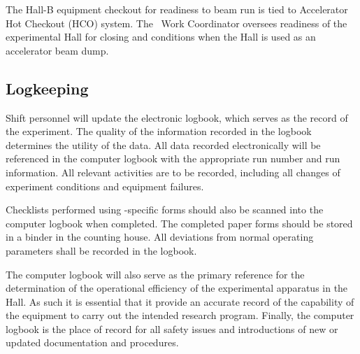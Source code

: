 \documentclass[11pt]{article}
\begin{document}
The Hall-B equipment checkout for readiness to beam run
is tied to Accelerator Hot Checkout (HCO) system. 
The \HALL\ Work Coordinator oversees readiness of the experimental Hall for closing and 
conditions when the Hall is used as an accelerator beam dump. 

\subsection{Logkeeping}
\indent

Shift personnel will update the electronic
logbook, which serves as the record of the experiment. 
The quality of the information recorded in the logbook 
determines the utility of the data.
All data recorded electronically
will be referenced in the  computer 
logbook with the appropriate run number and run information. All 
relevant activities are to be recorded, including 
all changes of experiment conditions and equipment failures.

Checklists performed using \HALL-specific forms should also be scanned 
into the computer logbook when completed. The completed paper forms should 
be stored in a binder in the counting house.  All deviations from normal 
operating parameters shall  be recorded in the logbook. 

The computer logbook will also serve as the primary reference for the
determination of the operational efficiency of the experimental apparatus in
the Hall. As such it is essential that it provide an accurate record of the 
capability of the equipment to carry out the intended research program. 
Finally, the computer logbook is the place of record for all safety issues and 
introductions of new or updated documentation and procedures.


\appendix
\end{document}
